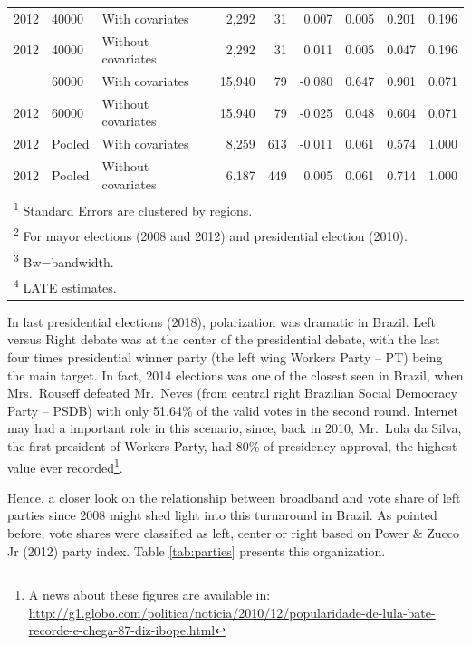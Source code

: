\documentclass[12pt,]{article}
\let\rmarkdownfootnote\footnote%
\def\footnote{\protect\rmarkdownfootnote}
\begin{document}
\begin{table}[!h]
\begin{tabular}{lllrrrrrr}
2012 & 40000 & With covariates & 2,292 & 31 & 0.007 & 0.005 & 0.201 & 0.196\\
2012 & 40000 & Without covariates & 2,292 & 31 & 0.011 & 0.005 & 0.047 & 0.196\\
\addlinespace
2012 & 60000 & With covariates & 15,940 & 79 & -0.080 & 0.647 & 0.901 & 0.071\\
2012 & 60000 & Without covariates & 15,940 & 79 & -0.025 & 0.048 & 0.604 & 0.071\\
2012 & Pooled & With covariates & 8,259 & 613 & -0.011 & 0.061 & 0.574 & 1.000\\
2012 & Pooled & Without covariates & 6,187 & 449 & 0.005 & 0.061 & 0.714 & 1.000\\
\bottomrule
\multicolumn{9}{l}{\textsuperscript{1} Standard Errors are clustered by regions.}\\
\multicolumn{9}{l}{\textsuperscript{2} For mayor elections (2008 and 2012) and presidential election (2010).}\\
\multicolumn{9}{l}{\textsuperscript{3} Bw=bandwidth.}\\
\multicolumn{9}{l}{\textsuperscript{4} LATE estimates.}\\
\end{tabular}
\end{table}

In last presidential elections (2018), polarization was dramatic in
Brazil. Left versus Right debate was at the center of the presidential
debate, with the last four times presidential winner party (the left
wing Workers Party -- PT) being the main target. In fact, 2014 elections
was one of the closest seen in Brazil, when Mrs.~Rouseff defeated
Mr.~Neves (from central right Brazilian Social Democracy Party -- PSDB)
with only 51.64\% of the valid votes in the second round. Internet may
had a important role in this scenario, since, back in 2010, Mr.~Lula da
Silva, the first president of Workers Party, had 80\% of presidency
approval, the highest value ever recorded\footnote{A news about these
  figures are available in:
  \url{http://g1.globo.com/politica/noticia/2010/12/popularidade-de-lula-bate-recorde-e-chega-87-diz-ibope.html}}.

Hence, a closer look on the relationship between broadband and vote
share of left parties since 2008 might shed light into this turnaround
in Brazil. As pointed before, vote shares were classified as left,
center or right based on Power \& Zucco Jr (2012) party index. Table
\ref{tab:parties} presents this organization.
\end{document}
